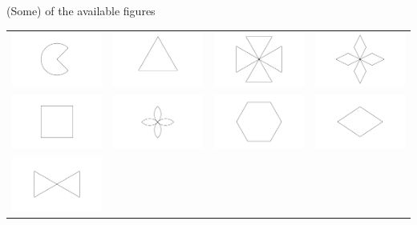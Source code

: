 \documentclass{beamer}
\begin{document}
\begin{frame}{(Some) of the available figures}
	\centering

		
			\begin{tabular}{c c c c}
			\includegraphics[width=0.2\linewidth]{img/pacman.pdf} & 
			\includegraphics[width=0.2\linewidth]{img/triangle.pdf} & 
			\includegraphics[width=0.2\linewidth]{img/malta.pdf} & 
			\includegraphics[width=0.2\linewidth]{img/maxi.pdf} \\
			\includegraphics[width=0.2\linewidth]{img/square.pdf} & 
			\includegraphics[width=0.2\linewidth]{img/lily.pdf} & 
			\includegraphics[width=0.2\linewidth]{img/hexagon.pdf} & 
			\includegraphics[width=0.2\linewidth]{img/luck.pdf} \\
			\includegraphics[width=0.2\linewidth]{img/bowtie.pdf} & 

\end{tabular}
\end{frame}
\end{document}
